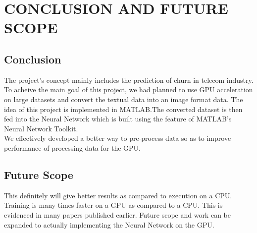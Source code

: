 

\chapter{CONCLUSION AND FUTURE SCOPE}
\section{Conclusion}
\hspace{0.9cm} The project's concept mainly includes the prediction of churn in telecom industry. To acheive the main goal of this project, we had planned to use GPU acceleration on large datasets and convert the textual data into an image format data. The idea of this project is implemented in MATLAB.The converted dataset is then fed into the Neural Network which is built using the feature of MATLAB's Neural Network Toolkit.\\ We effectively developed a better way to pre-process data so as to improve performance of processing data for the GPU.

\section{Future Scope}
\hspace{0.9cm} This definitely will give better results as compared to execution on a CPU. Training is many times faster on a GPU as compared to a CPU. This is evidenced in many papers published earlier. Future scope and work can be expanded to actually implementing the Neural Network on the GPU.